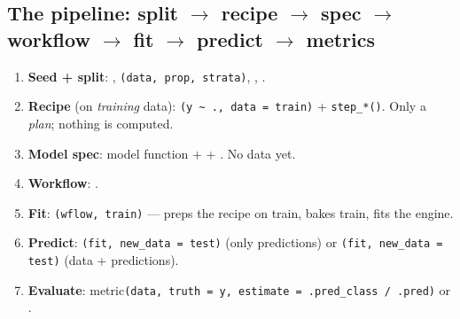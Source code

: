 \subsection{The pipeline: split $\to$ recipe $\to$ spec $\to$ workflow $\to$ fit $\to$ predict $\to$ metrics}
\begin{keybox}
\begin{enumerate}\setlength\itemsep{0pt}
\item \textbf{Seed + split}: , \texttt{(data, prop, strata)}, , .
\item \textbf{Recipe} (on \emph{training} data): \texttt{(y \textasciitilde{} ., data = train)} + \texttt{step\_*()}. Only a \emph{plan}; nothing is computed.
\item \textbf{Model spec}: model function +  + . No data yet.
\item \textbf{Workflow}:  \ixc{\%>\%}  \ixc{\%>\%} .
\item \textbf{Fit}: \texttt{(wflow, train)} --- preps the recipe on train, bakes train, fits the engine.
\item \textbf{Predict}: \texttt{(fit, new\_data = test)} (only predictions) or \texttt{(fit, new\_data = test)} (data + predictions).
\item \textbf{Evaluate}:  metric\texttt{(data, truth = y, estimate = .pred\_class / .pred)} or .
\end{enumerate}
\end{keybox}

